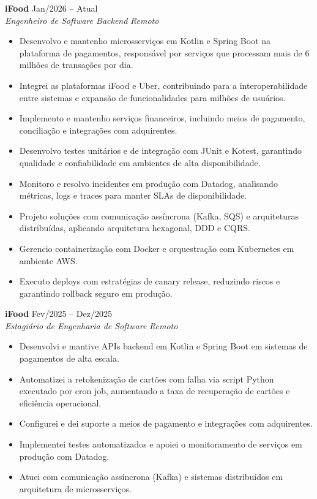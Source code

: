 \documentclass[a4paper,10pt]{article}
\newcommand{\entry}[4]{
  \noindent\textbf{#1} \hfill #2 \\
  \noindent\textit{#3} \hfill \textit{#4} \\
  \vspace{2pt}
}
\begin{document}
\entry{iFood}{\faCalendar \space Jan/2026 -- Atual}{Engenheiro de Software Backend}{\faMapMarker \space Remoto}
\space
\vspace{-1.6em}
\begin{itemize}
\setlength\itemsep{0em}
\item Desenvolvo e mantenho microsserviços em Kotlin e Spring Boot na plataforma de pagamentos, responsável por serviços que processam mais de 6 milhões de transações por dia.
\item Integrei as plataformas iFood e Uber, contribuindo para a interoperabilidade entre sistemas e expansão de funcionalidades para milhões de usuários.
\item Implemento e mantenho serviços financeiros, incluindo meios de pagamento, conciliação e integrações com adquirentes.
\item Desenvolvo testes unitários e de integração com JUnit e Kotest, garantindo qualidade e confiabilidade em ambientes de alta disponibilidade.
\item Monitoro e resolvo incidentes em produção com Datadog, analisando métricas, logs e traces para manter SLAs de disponibilidade.
\item Projeto soluções com comunicação assíncrona (Kafka, SQS) e arquiteturas distribuídas, aplicando arquitetura hexagonal, DDD e CQRS.
\item Gerencio containerização com Docker e orquestração com Kubernetes em ambiente AWS.
\item Executo deploys com estratégias de canary release, reduzindo riscos e garantindo rollback seguro em produção.
\end{itemize}

\entry{iFood}{\faCalendar \space Fev/2025 -- Dez/2025}{Estagiário de Engenharia de Software}{\faMapMarker \space Remoto}
\space
\vspace{-1.6em}
\begin{itemize}
\setlength\itemsep{0em}
\item Desenvolvi e mantive APIs backend em Kotlin e Spring Boot em sistemas de pagamentos de alta escala.
\item Automatizei a retokenização de cartões com falha via script Python executado por cron job, aumentando a taxa de recuperação de cartões e eficiência operacional.
\item Configurei e dei suporte a meios de pagamento e integrações com adquirentes.
\item Implementei testes automatizados e apoiei o monitoramento de serviços em produção com Datadog.
\item Atuei com comunicação assíncrona (Kafka) e sistemas distribuídos em arquitetura de microsserviços.
\end{itemize}
\end{document}
